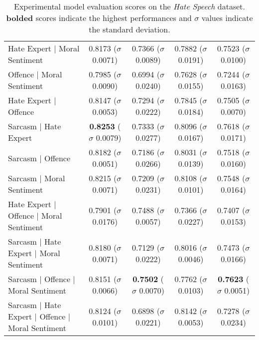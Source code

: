 \begin{table}[]
{\begin{tabular}{l|cccc}
    Hate Expert | Moral Sentiment                     & 0.8173 ($\sigma$ 0.0071)          & 0.7366 ($\sigma$ 0.0089)          & 0.7882 ($\sigma$ 0.0191)          & 0.7523 ($\sigma$ 0.0100)          \\
    Offence | Moral Sentiment                         & 0.7985 ($\sigma$ 0.0090)          & 0.6994 ($\sigma$ 0.0240)          & 0.7628 ($\sigma$ 0.0155)          & 0.7244 ($\sigma$ 0.0163)          \\
    Hate Expert | Offence                             & 0.8147 ($\sigma$ 0.0053)          & 0.7294 ($\sigma$ 0.0222)          & 0.7845 ($\sigma$ 0.0184)          & 0.7505 ($\sigma$ 0.0070)          \\
    Sarcasm | Hate Expert                             & \textbf{0.8253} ($\sigma$ 0.0079) & 0.7333 ($\sigma$ 0.0277)          & 0.8096 ($\sigma$ 0.0167)          & 0.7618 ($\sigma$ 0.0171)          \\
    Sarcasm | Offence                                 & 0.8182 ($\sigma$ 0.0051)          & 0.7186 ($\sigma$ 0.0266)          & 0.8031 ($\sigma$ 0.0139)          & 0.7518 ($\sigma$ 0.0160)          \\
    Sarcasm | Moral Sentiment                         & 0.8215 ($\sigma$ 0.0071)          & 0.7209 ($\sigma$ 0.0231)          & 0.8108 ($\sigma$ 0.0101)          & 0.7548 ($\sigma$ 0.0164)          \\
    Hate Expert | Offence | Moral Sentiment           & 0.7901 ($\sigma$ 0.0176)          & 0.7488 ($\sigma$ 0.0057)          & 0.7366 ($\sigma$ 0.0227)          & 0.7407 ($\sigma$ 0.0153)          \\
    Sarcasm | Hate Expert | Moral Sentiment           & 0.8180 ($\sigma$ 0.0071)          & 0.7129 ($\sigma$ 0.0222)          & 0.8016 ($\sigma$ 0.0046)          & 0.7473 ($\sigma$ 0.0166)          \\
    Sarcasm | Offence | Moral Sentiment               & 0.8151 ($\sigma$ 0.0066)          & \textbf{0.7502} ($\sigma$ 0.0070) & 0.7762 ($\sigma$ 0.0103)          & \textbf{0.7623} ($\sigma$ 0.0051) \\
    Sarcasm | Hate Expert | Offence | Moral Sentiment & 0.8124 ($\sigma$ 0.0101)          & 0.6898 ($\sigma$ 0.0221)          & 0.8142 ($\sigma$ 0.0053)          & 0.7278 ($\sigma$ 0.0234)
  \end{tabular}%
  }
  \caption{Experimental model evaluation scores on the \textit{Hate Speech} dataset. \textbf{bolded} scores indicate the highest performances and $\sigma$ values indicate the standard deviation.}
  \label{tab:mtl_test_wh}
\end{table}

